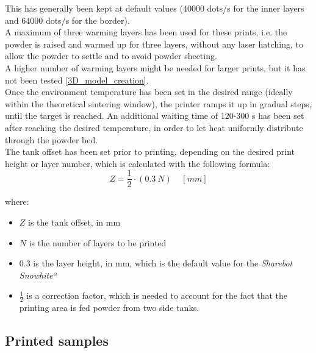 \documentclass{article}
\begin{document}
        This has generally been kept at default values (40000 dots/s for the inner layers and 64000 dots/s for the border).  \\ 

        A maximum of three warming layers has been used for these prints, i.e. the powder is raised and warmed 
        up for three layers, without any laser hatching, to allow the powder to settle and to avoid 
        powder sheeting. \\ 
        A higher number of warming layers might be needed for larger prints, but it has not been tested 
        \ref{3D_model_creation}. \\

        Once the environment temperature has been set in the desired range (ideally within the theoretical 
        sintering window), the printer ramps it up in gradual steps, until the target is reached.  
        An additional waiting time of 120-300 s has been set after reaching the desired temperature, in order to let heat 
        uniformly distribute through the powder bed. \\

        The tank offset has been set prior to printing, depending on the desired print height or 
        layer number, which is calculated with the following formula: \\
        
        \begin{equation}
            Z =  \frac{1}{2} \cdot (0.3 \  N) \ \ \ \ \  [mm]
            \label{eq:layer_height}
        \end{equation}
        
        
        where:
        \begin{itemize}
            \item $Z$ is the tank offset, in mm
            \item $N$ is the number of layers to be printed 
            \item $0.3$ is the layer height, in mm, which is the default value for the \textit{Sharebot Snowhite²}
            \item $\frac{1}{2}$ is a correction factor, which is needed to account for the fact that the printing area is fed powder 
            from two side tanks.
        \end{itemize}
        



        \clearpage
        \subsection{Printed samples\label{Printed_samples}}
\end{document}
